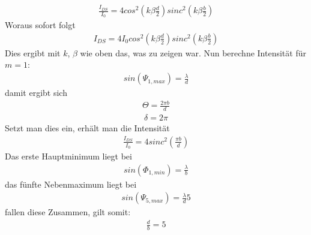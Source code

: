 \documentclass[a4paper,10pt]{scrartcl}
\begin{document}
\begin{align*}
\frac{I_{DS}}{I_{0}}=4cos^{2}(k\beta \frac{d}{2})sinc^{2}(k\beta\frac{b}{2})
\end{align*}
Woraus sofort folgt
\begin{align*}
I_{DS}=4I_{0}cos^{2}(k\beta \frac{d}{2})sinc^{2}(k\beta\frac{b}{2})
\end{align*}
Dies ergibt mit \(k\), \(\beta\) wie oben das, was zu zeigen war.
Nun berechne Intensität für \(m=1\):
\begin{align*}
sin(\Psi_{1,max})=\frac{\lambda}{d}
\end{align*}
damit ergibt sich
\begin{align*}
\Theta=\frac{2\pi b}{d}
\end{align*}
\begin{align*}
\delta=2\pi
\end{align*}
Setzt man dies ein, erhält man die Intensität
\begin{align*}
\frac{I_{DS}}{I_{0}}=4sinc^{2}(\frac{\pi b}{d})
\end{align*}
Das erste Hauptminimum liegt bei 
\begin{align*}
sin(\Phi_{1,min})=\frac{\lambda}{b}
\end{align*}
das fünfte Nebenmaximum liegt bei
\begin{align*}
sin(\Psi_{5,max})=\frac{\lambda}{d}5
\end{align*}
fallen diese Zusammen, gilt somit:
\begin{align*}
\frac{d}{b}=5
\end{align*}
\end{document}
